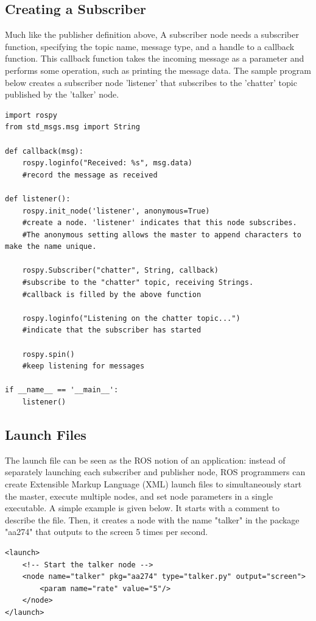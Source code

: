 \documentclass[twoside]{article}
\begin{document}
\subsection{Creating a Subscriber}
Much like the publisher definition above, A subscriber node needs a subscriber function, specifying the topic name, message type, and a handle to a callback function. This callback function takes the incoming message as a parameter and performs some operation, such as printing the message data. The sample program below creates a subscriber node 'listener' that subscribes to the 'chatter' topic published by the 'talker' node.
\begin{verbatim}
import rospy
from std_msgs.msg import String

def callback(msg):
    rospy.loginfo("Received: %s", msg.data)
    #record the message as received

def listener():
    rospy.init_node('listener', anonymous=True)
    #create a node. 'listener' indicates that this node subscribes.
    #The anonymous setting allows the master to append characters to make the name unique.

    rospy.Subscriber("chatter", String, callback)
    #subscribe to the "chatter" topic, receiving Strings.
    #callback is filled by the above function

    rospy.loginfo("Listening on the chatter topic...")
    #indicate that the subscriber has started

    rospy.spin()
    #keep listening for messages

if __name__ == '__main__':
	listener()
\end{verbatim}

\subsection{Launch Files}
The launch file can be seen as the ROS notion of an application: instead of separately launching each subscriber and publisher node, ROS programmers can create Extensible Markup Language (XML) launch files to simultaneously start the master, execute multiple nodes, and set node parameters in a single executable. A simple example is given below. It starts with a comment to describe the file. Then, it creates a node with the name "talker" in the package "aa274" that outputs to the screen 5 times per second.
\begin{verbatim}
<launch>
    <!-- Start the talker node -->
    <node name="talker" pkg="aa274" type="talker.py" output="screen">
        <param name="rate" value="5"/>
    </node>
</launch>
\end{verbatim}
\end{document}
